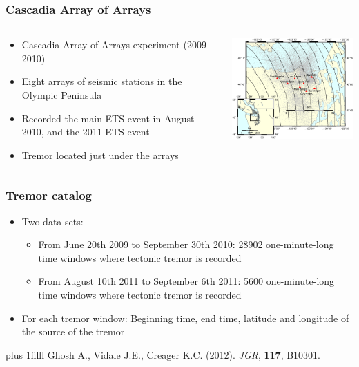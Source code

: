 \documentclass{beamer}
\newcommand{\btVFill}{\vskip0pt plus 1filll}
\begin{document}
	\begin{frame}
		\frametitle{Cascadia Array of Arrays}
		\begin{columns}[c]
			\begin{column}{5cm}
				\begin{itemize}
					\item Cascadia Array of Arrays experiment (2009-2010)
					\item Eight arrays of seismic stations in the Olympic Peninsula
					\item Recorded the main ETS event in August 2010, and the 2011 ETS event
					\item Tremor located just under the arrays
				\end{itemize}
			\end{column}
			\begin{column}{7cm}
				\begin{center}
					\includegraphics[trim={0cm 1cm 0cm 9.5cm}, clip, width=7cm]{AoA/arrays_location.eps}
				\end{center}
			\end{column}
		\end{columns}
	\end{frame}

	\begin{frame}
		\frametitle{Tremor catalog}
		\begin{itemize}
			\vspace{1em}

			\item Two data sets:
			\begin{itemize}
				\item From June 20th 2009 to September 30th 2010: 28902 one-minute-long time windows where tectonic tremor is recorded
				\item From August 10th 2011 to September 6th 2011: 5600 one-minute-long time windows where tectonic tremor is recorded
			\end{itemize}

			\vspace{1em}

			\item For each tremor window: Beginning time, end time, latitude and longitude of the source of the tremor
		\end{itemize}
		\btVFill
		\tiny{Ghosh A., Vidale J.E., Creager K.C. (2012). \textit{JGR}, \textbf{117}, B10301.}
	\end{frame}
\end{document}
